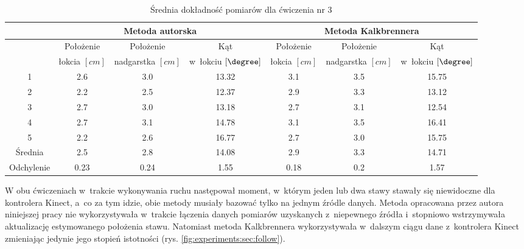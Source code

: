 \begin{table}[!htp]
	\caption{Średnia dokładność pomiarów dla ćwiczenia nr 3}
	\label{tab:experiments:thr:avg}
	\noindent
	\tiny
	\centering
	\begin{tabular}{|c|c|c|c|c|c|c|}
		\hline 
		& \multicolumn{3}{c|}{Metoda autorska} & \multicolumn{3}{c|}{Metoda Kalkbrennera}  \\ 
		\hline 
		           & Położenie    & Położenie       & Kąt                  & Położenie    & Położenie       & Kąt                  \\
		           & łokcia $[cm]$ & nadgarstka $[cm]$ & w~łokciu	$[\degree]$ & łokcia $[cm]$ & nadgarstka $[cm]$ & w~łokciu	$[\degree]$ \\
		\hline
		1          & 2.6            & 3.0               & 13.32                 & 3.1            & 3.5               & 15.75                 \\
		2          & 2.2            & 2.5               & 12.37                 & 2.9            & 3.3               & 13.12                 \\
		3          & 2.7            & 3.0               & 13.18                 & 2.7            & 3.1               & 12.54                 \\
		4          & 2.7            & 3.1               & 14.78                 & 3.1            & 3.5               & 16.41                 \\
		5          & 2.2            & 2.6               & 16.77                 & 2.7            & 3.0               & 15.75                 \\
		\hline
		Średnia   & 2.5            & 2.8               & 14.08                 & 2.9            & 3.3               & 14.71                 \\
		Odchylenie & 0.23           & 0.24              & 1.55                  & 0.18           & 0.2               & 1.57                  \\
		\hline
	\end{tabular} 
						
\end{table} 

W obu ćwiczeniach w~trakcie wykonywania ruchu następował moment, w~którym jeden lub dwa stawy stawały się niewidoczne dla kontrolera Kinect, a~co za tym idzie, obie metody musiały bazować tylko na jednym źródle danych. Metoda opracowana przez autora niniejszej pracy nie wykorzystywała  w~trakcie łączenia danych pomiarów uzyskanych z~niepewnego źródła i~stopniowo wstrzymywała aktualizację estymowanego położenia stawu. Natomiast metoda Kalkbrennera wykorzystywała w~dalszym ciągu dane z~kontrolera Kinect zmieniając jedynie jego stopień istotności (rys. \ref{fig:experiments:sec:follow}). 

